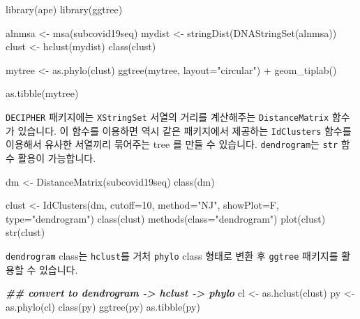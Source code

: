 \documentclass[
]{book}
\newenvironment{Shaded}{\begin{snugshade}}{\end{snugshade}}
\newcommand{\AttributeTok}[1]{\textcolor[rgb]{0.77,0.63,0.00}{#1}}
\newcommand{\DecValTok}[1]{\textcolor[rgb]{0.00,0.00,0.81}{#1}}
\newcommand{\DocumentationTok}[1]{\textcolor[rgb]{0.56,0.35,0.01}{\textbf{\textit{#1}}}}
\newcommand{\FunctionTok}[1]{\textcolor[rgb]{0.00,0.00,0.00}{#1}}
\newcommand{\NormalTok}[1]{#1}
\newcommand{\OtherTok}[1]{\textcolor[rgb]{0.56,0.35,0.01}{#1}}
\newcommand{\SpecialCharTok}[1]{\textcolor[rgb]{0.00,0.00,0.00}{#1}}
\newcommand{\StringTok}[1]{\textcolor[rgb]{0.31,0.60,0.02}{#1}}
\begin{document}
\begin{Shaded}
\begin{Highlighting}[]
\FunctionTok{library}\NormalTok{(ape)}
\FunctionTok{library}\NormalTok{(ggtree)}

\NormalTok{alnmsa }\OtherTok{\textless{}{-}} \FunctionTok{msa}\NormalTok{(subcovid19seq)}
\NormalTok{mydist }\OtherTok{\textless{}{-}} \FunctionTok{stringDist}\NormalTok{(}\FunctionTok{DNAStringSet}\NormalTok{(alnmsa))}
\NormalTok{clust }\OtherTok{\textless{}{-}} \FunctionTok{hclust}\NormalTok{(mydist)}
\FunctionTok{class}\NormalTok{(clust)}

\NormalTok{mytree }\OtherTok{\textless{}{-}} \FunctionTok{as.phylo}\NormalTok{(clust)}
\FunctionTok{ggtree}\NormalTok{(mytree, }\AttributeTok{layout=}\StringTok{"circular"}\NormalTok{) }\SpecialCharTok{+}
  \FunctionTok{geom\_tiplab}\NormalTok{()}

\FunctionTok{as.tibble}\NormalTok{(mytree)}
\end{Highlighting}
\end{Shaded}

\texttt{DECIPHER} 패키지에는 \texttt{XStringSet} 서열의 거리를 계산해주는 \texttt{DistanceMatrix} 함수가 있습니다. 이 함수를 이용하면 역시 같은 패키지에서 제공하는 \texttt{IdClusters} 함수를 이용해서 유사한 서열끼리 묶어주는 tree 를 만들 수 있습니다. \texttt{dendrogram}는 \texttt{str} 함수 활용이 가능합니다.

\begin{Shaded}
\begin{Highlighting}[]
\NormalTok{dm }\OtherTok{\textless{}{-}} \FunctionTok{DistanceMatrix}\NormalTok{(subcovid19seq)}
\FunctionTok{class}\NormalTok{(dm)}

\NormalTok{clust }\OtherTok{\textless{}{-}} \FunctionTok{IdClusters}\NormalTok{(dm, }\AttributeTok{cutoff=}\DecValTok{10}\NormalTok{, }\AttributeTok{method=}\StringTok{"NJ"}\NormalTok{, }\AttributeTok{showPlot=}\NormalTok{F, }\AttributeTok{type=}\StringTok{"dendrogram"}\NormalTok{)}
\FunctionTok{class}\NormalTok{(clust)}
\FunctionTok{methods}\NormalTok{(}\AttributeTok{class=}\StringTok{"dendrogram"}\NormalTok{)}
\FunctionTok{plot}\NormalTok{(clust)}
\FunctionTok{str}\NormalTok{(clust)}
\end{Highlighting}
\end{Shaded}

\texttt{dendrogram} class는 \texttt{hclust}를 거처 \texttt{phylo} class 형태로 변환 후 \texttt{ggtree} 패키지를 활용할 수 있습니다.

\begin{Shaded}
\begin{Highlighting}[]
\DocumentationTok{\#\# convert to dendrogram {-}\textgreater{} hclust {-}\textgreater{} phylo }
\NormalTok{cl }\OtherTok{\textless{}{-}} \FunctionTok{as.hclust}\NormalTok{(clust)}
\NormalTok{py }\OtherTok{\textless{}{-}} \FunctionTok{as.phylo}\NormalTok{(cl)}
\FunctionTok{class}\NormalTok{(py)}
\FunctionTok{ggtree}\NormalTok{(py)}
\FunctionTok{as.tibble}\NormalTok{(py)}
\end{Highlighting}
\end{Shaded}
\end{document}
